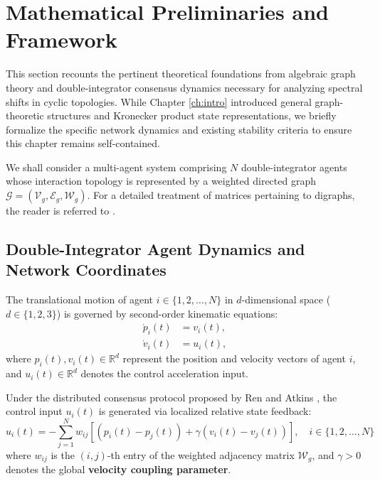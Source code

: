 \section{Mathematical Preliminaries and Framework}\label{sec:ch_TRE_Prelims}
This section recounts the pertinent theoretical foundations from algebraic graph theory and double-integrator consensus dynamics necessary for analyzing spectral shifts in cyclic topologies. While Chapter \ref{ch:intro} introduced general graph-theoretic structures and Kronecker product state representations, we briefly formalize the specific network dynamics and existing stability criteria to ensure this chapter remains self-contained. 

We shall consider a multi-agent system comprising $N$ double-integrator agents whose interaction topology is represented by a weighted directed graph $\mathcal{G} = (\mathcal{V}_g, \mathcal{E}_g, \mathcal{W}_g)$. For a detailed treatment of matrices pertaining to digraphs, the reader is referred to \cite{godsil2001algebraic, mesbahi2010graph}.

\subsection{Double-Integrator Agent Dynamics and Network Coordinates}\label{sub_sec:ch_TRE_AgentDynamics}
The translational motion of agent $i \in \{1, 2, \dots, N\}$ in $d$-dimensional space ($d \in \{1, 2, 3\}$) is governed by second-order kinematic equations:
\begin{equation} \label{eq:ch_TRE_second_order}
	\begin{aligned}
		\dot{p}_i(t) &= v_i(t), \\
		\dot{v}_i(t) &= u_i(t),
	\end{aligned}
\end{equation}
where $p_i(t), v_i(t) \in \mathbb{R}^d$ represent the position and velocity vectors of agent $i$, and $u_i(t) \in \mathbb{R}^d$ denotes the control acceleration input.

Under the distributed consensus protocol proposed by Ren and Atkins \cite{ren2005second, ren2008consensus}, the control input $u_i(t)$ is generated via localized relative state feedback:
\begin{equation} \label{eq:ch_TRE_agent_wise}
	u_i(t) = -\sum_{j=1}^{N} w_{ij} \left[ (p_i(t) - p_j(t)) + \gamma (v_i(t) - v_j(t)) \right], \quad i \in \{1, 2, \dots, N\}
\end{equation}
where $w_{ij}$ is the $(i,j)$-th entry of the weighted adjacency matrix $\mathcal{W}_g$, and $\gamma > 0$ denotes the global \textbf{velocity coupling parameter}.

